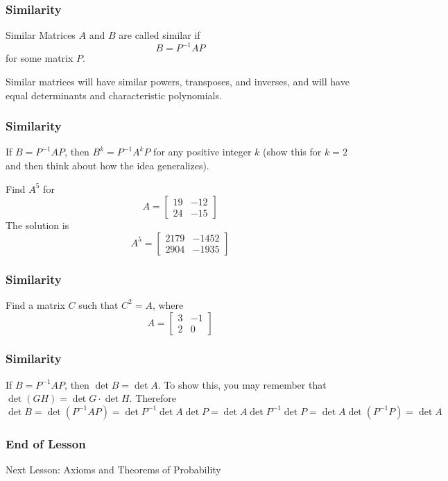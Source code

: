 \documentclass[xcolor=dvipsnames]{beamer}
\begin{document}
\begin{frame}
  \frametitle{Similarity}
  \begin{block}{Similar Matrices}
    $A$ and $B$ are called \alert{similar} if
    \begin{equation}
      \label{eq:aemiezef}
      B=P^{-1}AP
    \end{equation}
    for some matrix $P$. 
  \end{block}
Similar matrices will have similar powers, transposes, and inverses,
and will have equal determinants and characteristic polynomials.
\end{frame}

\begin{frame}
  \frametitle{Similarity}
  If $B=P^{-1}AP$, then $B^{k}=P^{-1}A^{k}P$ for any positive integer
  $k$ (show this for $k=2$ and then think about how the idea
  generalizes).

  \bigskip

  {\ubung} Find $A^{5}$ for
  \begin{equation}
    \label{eq:aisejiez}
    A=\left[
      \begin{array}{cc}
        19&-12 \\
        24&-15
      \end{array}\right]
  \end{equation}
  The solution is
  \begin{equation}
    \label{eq:pheishae}
    A^{5}=\left[
      \begin{array}{cc}
        2179&-1452 \\
        2904&-1935
      \end{array}\right]
  \end{equation}
\end{frame}

\begin{frame}
  \frametitle{Similarity}
  {\ubung} Find a matrix $C$ such that $C^{2}=A$, where
  \begin{equation}
    \label{eq:phaithee}
    A=\left[
      \begin{array}{cc}
        3&-1 \\
        2&0
      \end{array}\right]
  \end{equation}
\end{frame}

\begin{frame}
  \frametitle{Similarity}
  If $B=P^{-1}AP$, then $\det{}B=\det{}A$. To show this, you may
  remember that $\det{}(GH)=\det{}G\cdot\det{}H$. Therefore
  \begin{equation}
    \label{eq:taichahh}
    \det{}B=\det(P^{-1}AP)=\det{}P^{-1}\det{}A\det{}P=\det{}A\det{}P^{-1}\det{}P=\det{}A\det(P^{-1}P)=\det{}A
  \end{equation}
\end{frame}

\begin{frame}
  \frametitle{End of Lesson}
Next Lesson: Axioms and Theorems of Probability
\end{frame}
\end{document}
